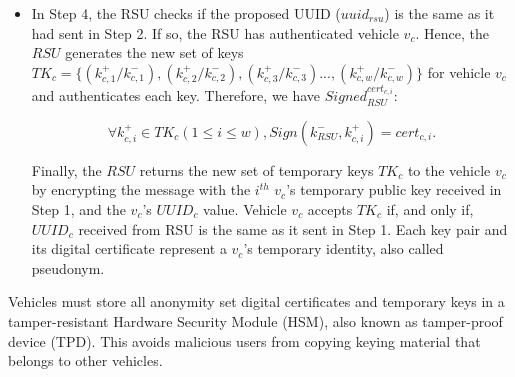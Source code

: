 \documentclass[preprint,12pt]{elsarticle}
\begin{document}
\begin{itemize}
	\item In Step 4, the RSU checks if the proposed UUID ($uuid_{rsu}$) is the same as it had sent in Step 2. If so,  the RSU has authenticated vehicle $v_{c}$. Hence, the $RSU$ generates the new set of keys $TK_{c} = \{ (k^{+}_{c,1}/k^{-}_{c,1}), (k^{+}_{c,2}/k^{-}_{c,2}), (k^{+}_{c,3}/k^{-}_{c,3})..., (k^{+}_{c,w}/k^{-}_{c,w})\}$ for vehicle $v_{c}$ and authenticates each key. Therefore, we have $Signed^{cert_{c,i}}_{RSU}$:
	
	\begin{equation}
\label{eq:etapa22}
	\forall k^{+}_{c,i} \in TK_{c} (1 \le i \le w), Sign(k^{-}_{RSU}, k^{+}_{c,i}) = cert_{c,i}.
\end{equation}

	Finally, the $RSU$ returns the new set of temporary keys  $TK_{c}$ to the vehicle $v_{c}$ by encrypting the message with the $i^{th}$ $v_{c}$'s temporary public key received in Step 1, and the $v_{c}$'s $UUID_c$ value. Vehicle $v_{c}$ accepts $TK_c$ if, and only if, $UUID_c$ received from RSU is the same as it sent in Step 1. Each key pair and its digital certificate represent a $v_{c}$'s temporary identity, also called pseudonym.
	
\end{itemize}

Vehicles must store all anonymity set digital certificates and temporary keys in a tamper-resistant Hardware Security Module (HSM), also known as tamper-proof device (TPD). This avoids malicious users from copying keying material that belongs to other vehicles.



\end{document}
